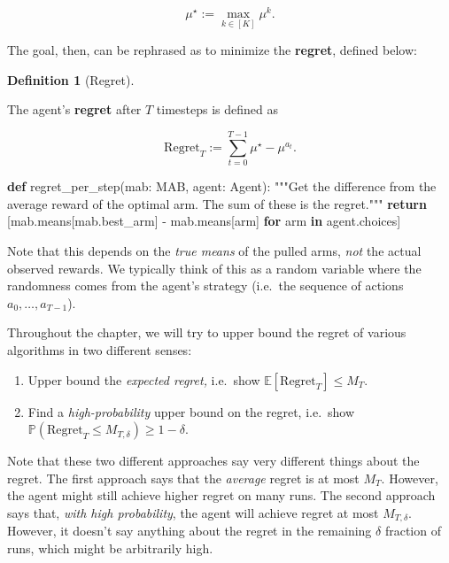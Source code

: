 \documentclass[
  letterpaper,
  DIV=11,
  numbers=noendperiod]{scrreprt}
\newenvironment{Shaded}{\begin{snugshade}}{\end{snugshade}}
\newcommand{\CommentTok}[1]{\textcolor[rgb]{0.37,0.37,0.37}{#1}}
\newcommand{\ControlFlowTok}[1]{\textcolor[rgb]{0.00,0.23,0.31}{\textbf{#1}}}
\newcommand{\KeywordTok}[1]{\textcolor[rgb]{0.00,0.23,0.31}{\textbf{#1}}}
\newcommand{\NormalTok}[1]{\textcolor[rgb]{0.00,0.23,0.31}{#1}}
\newcommand{\OperatorTok}[1]{\textcolor[rgb]{0.37,0.37,0.37}{#1}}
\theoremstyle{plain}
\theoremstyle{plain}
\theoremstyle{definition}
\theoremstyle{definition}
\newtheorem{definition}{Definition}[chapter]
\theoremstyle{remark}
\begin{document}
\[\mu^\star := \max_{k \in [K]} \mu^k.\]

The goal, then, can be rephrased as to minimize the \textbf{regret},
defined below:

\begin{definition}[Regret]\protect\hypertarget{def-regret}{}\label{def-regret}

The agent's \textbf{regret} after \(T\) timesteps is defined as

\[
\text{Regret}_T := \sum_{t=0}^{T-1} \mu^\star - \mu^{a_t}.
\]

\end{definition}

\begin{Shaded}
\begin{Highlighting}[]
\KeywordTok{def}\NormalTok{ regret\_per\_step(mab: MAB, agent: Agent):}
    \CommentTok{"""Get the difference from the average reward of the optimal arm. The sum of these is the regret."""}
    \ControlFlowTok{return}\NormalTok{ [mab.means[mab.best\_arm] }\OperatorTok{{-}}\NormalTok{ mab.means[arm] }\ControlFlowTok{for}\NormalTok{ arm }\KeywordTok{in}\NormalTok{ agent.choices]}
\end{Highlighting}
\end{Shaded}

Note that this depends on the \emph{true means} of the pulled arms,
\emph{not} the actual observed rewards. We typically think of this as a
random variable where the randomness comes from the agent's strategy
(i.e.~the sequence of actions \(a_0, \dots, a_{T-1}\)).

Throughout the chapter, we will try to upper bound the regret of various
algorithms in two different senses:

\begin{enumerate}
\def\labelenumi{\arabic{enumi}.}
\item
  Upper bound the \emph{expected regret,} i.e.~show
  \(\mathbb{E}[\text{Regret}_T] \le M_T\).
\item
  Find a \emph{high-probability} upper bound on the regret, i.e.~show
  \(\mathbb{P}(\text{Regret}_T \le M_{T, \delta}) \ge 1-\delta\).
\end{enumerate}

Note that these two different approaches say very different things about
the regret. The first approach says that the \emph{average} regret is at
most \(M_T\). However, the agent might still achieve higher regret on
many runs. The second approach says that, \emph{with high probability},
the agent will achieve regret at most \(M_{T, \delta}\). However, it
doesn't say anything about the regret in the remaining \(\delta\)
fraction of runs, which might be arbitrarily high.
\end{document}
